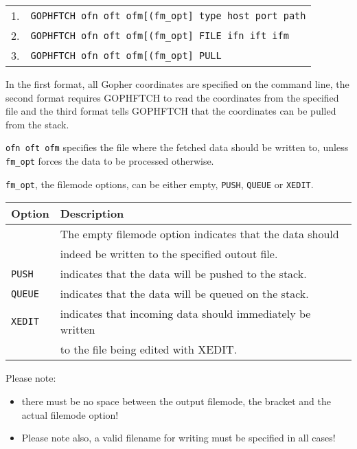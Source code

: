 \begin{center}\begin{tabular}{l|l|}\cline{2-2}
1. & \verb#GOPHFTCH ofn oft ofm[(fm_opt] type host port path#     \\ \cline{2-2}
2. & \verb#GOPHFTCH ofn oft ofm[(fm_opt] FILE ifn ift ifm#        \\ \cline{2-2}
3. & \verb#GOPHFTCH ofn oft ofm[(fm_opt] PULL#                    \\ \cline{2-2}
\end{tabular}\end{center}

\rule{0mm}{3mm}

In the first format, all Gopher coordinates are specified on the
command line, the second format requires GOPHFTCH to read the coordinates
from the specified file and the third format tells GOPHFTCH that the
coordinates can be pulled from the stack.


\verb#ofn oft ofm# specifies the file where the fetched data should be
written to, unless {\tt fm\_opt} forces the data to be processed otherwise.

\verb#fm_opt#, the filemode options, can be either empty,
{\tt PUSH}, {\tt QUEUE} or {\tt XEDIT}.\\
\rule{0mm}{1mm}

\begin{tabular}{|l|l|}\hline
Option     & Description \\ \hline \hline
           & The empty filemode option indicates that the data should\\
           & indeed be written to the specified outout file. \\ \hline
{\tt PUSH} & indicates that the data will be pushed to the stack. \\ \hline
{\tt QUEUE}& indicates that the data will be queued on the stack. \\ \hline
{\tt XEDIT}& indicates that incoming data should immediately be written\\
           & to the file being edited with XEDIT. \\ \hline
\end{tabular}

\rule{0mm}{3mm}

\noindent
Please note:
\begin{itemize}
\item   there must be no space between the output filemode, the
        bracket and the actual filemode option!
\item   Please note also, a valid filename for writing must be
        specified in all cases!
\end{itemize}

